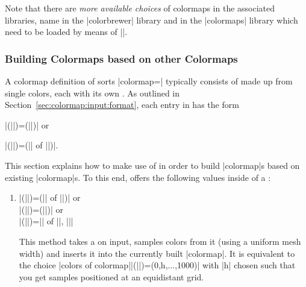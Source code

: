 Note that there are \emph{more available choices} of colormaps in the
associated libraries, name in the |colorbrewer| library and in the |colormaps|
library which need to be loaded by means of
||.


\subsubsection{Building Colormaps based on other Colormaps}
\label{sec:pgfplots:colormaps:based:on:others}

{
A colormap definition of sorts |colormap=|
typically consists of  made up from single colors,
each with its own . As outlined in
Section~\ref{sec:colormap:input:format}, each entry in  has the form

    |(||)=(||)| or

    |(||)=(|| of ||)|.

\noindent This section explains how to make use of  in order
to build |colormap|s based on existing |colormap|s. To this end, \PGFPlots{}
offers the following values inside of a :

\begin{enumerate}
    \item
        |(||)=(|| of ||)| or\\
        |(||)=(||)| or\\
        |(||)={|| of ||, ||}|%

        This method takes a  on input, samples 
        colors from it (using a uniform mesh width) and inserts it into the
        currently built |colormap|. It is equivalent to the choice
        |colors of colormap||(||)=(0,h,...,1000)| with |h|
        chosen such that you get  samples positioned at an
        equidistant grid.

\begin{codeexample}[]
\pgfplotscolorbardrawstandalone[
    colormap={example}{
        samples of colormap=(4 of viridis)
    },
    colorbar horizontal,
    colormap access=const,
]
\end{codeexample}


\end{enumerate}}
